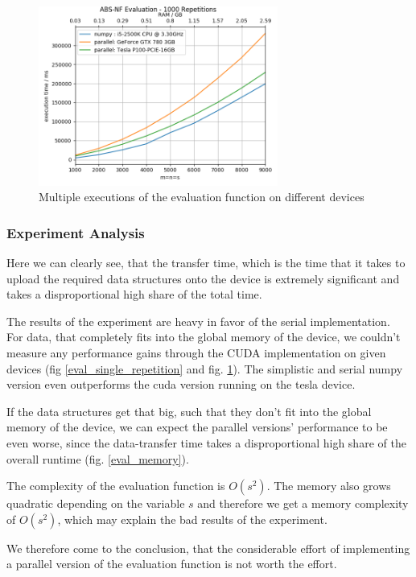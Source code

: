 \begin{figure}[ht]
	\centering
	\includegraphics[width=0.7\textwidth]{img/eval_mult_repetition.png}
	\caption{Multiple executions of the evaluation function on different devices}
	\label{eval_1000}
\end{figure}

\subsubsection{Experiment Analysis}

Here we can clearly see, that the transfer time, which is the time that it takes to upload the required data structures onto the device is extremely significant and takes a disproportional high share of the total time.

The results of the experiment are heavy in favor of the serial implementation.\\
For data, that completely fits into the global memory of the device, we couldn't measure any performance gains through the CUDA implementation on given devices (fig \ref{eval_single_repetition} and  fig. \ref{eval_1000}). The simplistic and serial numpy version even outperforms the cuda version running on the tesla device.

If the data structures get that big, such that they don't fit into the global memory of the device, we can expect the parallel versions' performance to be even worse, since the data-transfer time takes a disproportional high share of the overall runtime (fig. \ref{eval_memory}).

The complexity of the evaluation function is $O(s^2)$. The memory also grows quadratic depending on the variable $s$ and therefore we get a memory complexity of $O(s^2)$, which may explain the bad results of the experiment.

We therefore come to the conclusion, that the considerable effort of implementing a parallel version of the evaluation function is not worth the effort.

